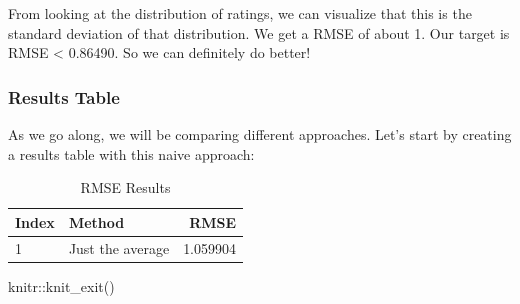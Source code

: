 \documentclass[
]{article}
\newenvironment{Shaded}{}{}
\newcommand{\DecValTok}[1]{\textcolor[rgb]{0.25,0.63,0.44}{#1}}
\newcommand{\FloatTok}[1]{\textcolor[rgb]{0.25,0.63,0.44}{#1}}
\newcommand{\FunctionTok}[1]{\textcolor[rgb]{0.02,0.16,0.49}{#1}}
\newcommand{\NormalTok}[1]{#1}
\newcommand{\OtherTok}[1]{\textcolor[rgb]{0.00,0.44,0.13}{#1}}
\newcommand{\SpecialCharTok}[1]{\textcolor[rgb]{0.25,0.44,0.63}{#1}}
\begin{document}
\begin{Shaded}
\end{Shaded}

From looking at the distribution of ratings, we can visualize that this
is the standard deviation of that distribution. We get a RMSE of about
1. Our target is RMSE \textless{} 0.86490. So we can definitely do
better!

\newpage

\hypertarget{results-table}{%
\subsubsection{Results Table}\label{results-table}}

As we go along, we will be comparing different approaches. Let's start
by creating a results table with this naive approach:

\begin{table}[H]

\caption{\label{tab:unnamed-chunk-2}RMSE Results\label{tbl:rmse_results}}
\centering
\fontsize{7}{9}\selectfont
\begin{tabular}[t]{llr}
\toprule
Index & Method & RMSE\\
\midrule
1 & Just the average & 1.059904\\
\bottomrule
\end{tabular}
\end{table}

\begin{Shaded}
\begin{Highlighting}[]
\NormalTok{    knitr}\SpecialCharTok{::}\FunctionTok{knit\_exit}\NormalTok{()}
\end{Highlighting}
\end{Shaded}
\end{document}
